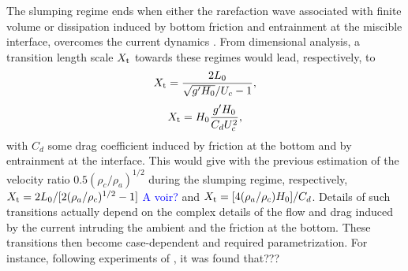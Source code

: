 \documentclass[twocolumn]{article}
\begin{document}
The slumping regime ends when either the rarefaction wave associated with finite volume or dissipation induced by bottom friction and entrainment at the miscible interface, overcomes the current dynamics \citep{???}.
From dimensional analysis, a transition length scale $X_{\rm t}$ towards these regimes would lead, respectively, to
\begin{equation}
	\label{eq:Xt_inertial}
	\displaystyle    X_{\rm t}=  \frac{2L_0 }{\sqrt{g'H_0}/U_c - 1},
\end{equation}
\begin{equation}
	\label{eq:Xt_drag}
	\displaystyle    X_{\rm t}=H_0  \frac{g'H_0}{C_dU_c^2},
\end{equation}
with $C_d$ some drag coefficient induced by friction at the bottom and by entrainment at the interface. This would give with the previous estimation of the velocity ratio $0.5(\rho_c/\rho_a)^{1/2}$ during the slumping regime, respectively,
$X_{\rm t}=2L_0/[2(\rho_a/\rho_c)^{1/2}-1]$ \textcolor{blue}{A voir? } and $X_{\rm t}=[4(\rho_a/\rho_c)H_0]/C_d$.
Details of such transitions actually depend on the complex details of the flow and drag induced by the current intruding the ambient and the friction at the bottom. These transitions then become case-dependent and required parametrization. For instance, following experiments of \cite{Rottman1983}, it was found that???

\end{document}
